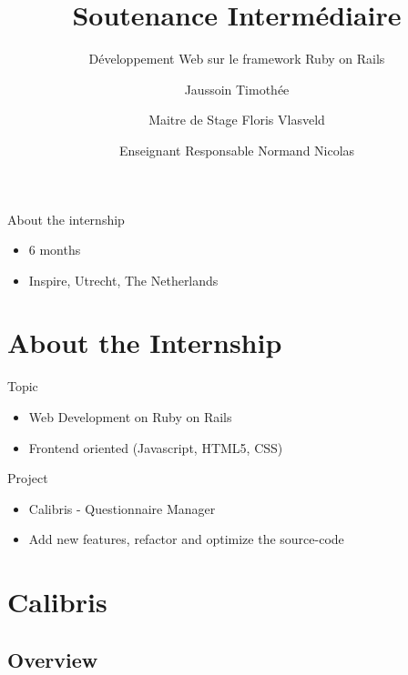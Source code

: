 \documentclass[10pt,a4paper]{beamer}
\subtitle{Développement Web sur le framework Ruby on Rails}
\title{Soutenance Intermédiaire}
\author{Jaussoin Timothée \\ \and Maitre de Stage Floris Vlasveld \\ \and Enseignant Responsable Normand Nicolas}
\institute{Polytech Nantes - Département Informatique}
\begin{document}
\begin{frame}
  \titlepage
\end{frame}

\begin{frame}{About the internship}
  \begin{itemize}
    \item 6 months
    \item Inspire, Utrecht, The Netherlands
  \end{itemize}
  
  \section{About the Internship}
  
  \begin{block}{Topic}
    \begin{itemize}
      \item Web Development on Ruby on Rails
      \item Frontend oriented (Javascript, HTML5, CSS)
    \end{itemize}
  \end{block}

  \begin{block}{Project}
    \begin{itemize}
      \item Calibris - Questionnaire Manager
      \item Add new features, refactor and optimize the source-code
    \end{itemize}
  \end{block}
\end{frame}

\section{Calibris}
\subsection{Overview}
\end{document}
